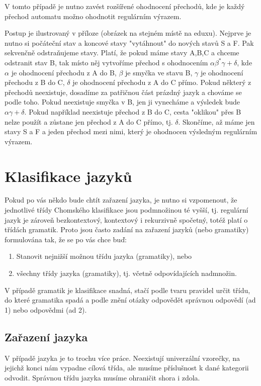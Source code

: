 \documentclass{article}
\begin{document}
V tomto případě je nutno zavést rozšířené ohodnocení přechodů, kde je každý přechod automatu možno ohodnotit regulárním výrazem.

Postup je ilustrovaný v příloze (obrázek na stejném místě na eduxu). Nejprve je nutno si počáteční stav a koncové stavy "vytáhnout" do nových stavů S a F. Pak sekvenčně odstraňujeme stavy. Platí, že pokud máme stavy A,B,C a chceme odstranit stav B, tak místo něj vytvoříme přechod s ohodnocením $\alpha \beta^* \gamma + \delta$, kde $\alpha$ je ohodnocení přechodu z A do B, $\beta$ je smyčka ve stavu B, $\gamma$ je ohodnocení přechodu z B do C, $\delta$ je ohodnocení přechodu z A do C přímo.
Pokud některý z přechodů neexistuje, dosadíme za patřičnou část prázdný jazyk a chováme se podle toho. Pokud neexistuje smyčka v B, jen ji vynecháme a výsledek bude $\alpha \gamma + \delta$. Pokud například neexistuje přechod z B do C, cesta "oklikou" přes B nelze použít a zůstane jen přechod z A do C přímo, tj. $\delta$. Skončíme, až máme jen stavy S a F a jeden přechod mezi nimi, který je ohodnocen výsledným regulárním výrazem.

\section{Klasifikace jazyků}

Pokud po vás někdo bude chtít zařazení jazyka, je nutno si vzpomenout, že jednotlivé třídy Chomského klasifikace jsou podmnožinou té vyšší, tj. regulární jazyk je zároveň bezkontextový, kontextový i rekurzivně spočetný, totéž platí o třídách gramatik. Proto jsou často zadání na zařazení jazyků (nebo gramatiky) formulována tak, že se po vás chce buď:
\begin{enumerate}
\item Stanovit nejnižší možnou třídu jazyka (gramatiky), nebo
\item všechny třídy jazyka (gramatiky), tj. včetně odpovídajících nadmnožin.
\end{enumerate}

V případě gramatik je klasifikace snadná, stačí podle tvaru pravidel určit třídu, do které gramatika spadá a podle znění otázky odpovědět správnou odpovědí (ad 1) nebo odpovědmi (ad 2).

\subsection{Zařazení jazyka}

V případě jazyka je to trochu více práce.
Neexistují univerzální vzorečky, na jejichž konci nám vypadne cílová třída, ale musíme příslušnost k dané kategorii odvodit.
Správnou třídu jazyka musíme ohraničit shora i zdola.
\end{document}
